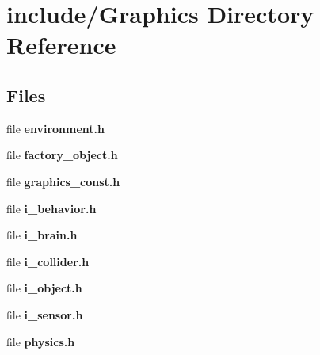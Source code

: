 \section{include/\+Graphics Directory Reference}
\label{dir_b43dbc6878c2b5c121b79d76cc4886e7}
\subsection*{Files}
\begin{DoxyCompactItemize}
\item 
file {\bfseries environment.\+h}
\item 
file {\bfseries factory\+\_\+object.\+h}
\item 
file {\bfseries graphics\+\_\+const.\+h}
\item 
file {\bfseries i\+\_\+behavior.\+h}
\item 
file {\bfseries i\+\_\+brain.\+h}
\item 
file {\bfseries i\+\_\+collider.\+h}
\item 
file {\bfseries i\+\_\+object.\+h}
\item 
file {\bfseries i\+\_\+sensor.\+h}
\item 
file {\bfseries physics.\+h}
\end{DoxyCompactItemize}
